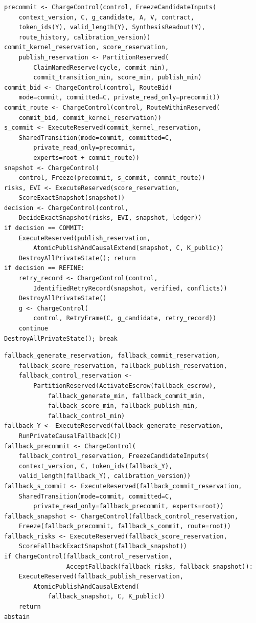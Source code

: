 \documentclass[10pt,a4paper]{article}
\begin{document}
\begin{lstlisting}[caption={Barrier-mediated verification, synthesis, and atomic commitment.},label={lst:verify}]
precommit <- ChargeControl(control, FreezeCandidateInputs(
    context_version, C, g_candidate, A, V, contract,
    token_ids(Y), valid_length(Y), SynthesisReadout(Y),
    route_history, calibration_version))
commit_kernel_reservation, score_reservation,
    publish_reservation <- PartitionReserved(
        ClaimNamedReserve(cycle, commit_min),
        commit_transition_min, score_min, publish_min)
commit_bid <- ChargeControl(control, RouteBid(
    mode=commit, committed=C, private_read_only=precommit))
commit_route <- ChargeControl(control, RouteWithinReserved(
    commit_bid, commit_kernel_reservation))
s_commit <- ExecuteReserved(commit_kernel_reservation,
    SharedTransition(mode=commit, committed=C,
        private_read_only=precommit,
        experts=root + commit_route))
snapshot <- ChargeControl(
    control, Freeze(precommit, s_commit, commit_route))
risks, EVI <- ExecuteReserved(score_reservation,
    ScoreExactSnapshot(snapshot))
decision <- ChargeControl(control,
    DecideExactSnapshot(risks, EVI, snapshot, ledger))
if decision == COMMIT:
    ExecuteReserved(publish_reservation,
        AtomicPublishAndCausalExtend(snapshot, C, K_public))
    DestroyAllPrivateState(); return
if decision == REFINE:
    retry_record <- ChargeControl(control,
        IdentifiedRetryRecord(snapshot, verified, conflicts))
    DestroyAllPrivateState()
    g <- ChargeControl(
        control, RetryFrame(C, g_candidate, retry_record))
    continue
DestroyAllPrivateState(); break
\end{lstlisting}

\begin{lstlisting}[caption={Single-escrow causal fallback and guarded publication.},label={lst:fallback}]
fallback_generate_reservation, fallback_commit_reservation,
    fallback_score_reservation, fallback_publish_reservation,
    fallback_control_reservation <-
        PartitionReserved(ActivateEscrow(fallback_escrow),
            fallback_generate_min, fallback_commit_min,
            fallback_score_min, fallback_publish_min,
            fallback_control_min)
fallback_Y <- ExecuteReserved(fallback_generate_reservation,
    RunPrivateCausalFallback(C))
fallback_precommit <- ChargeControl(
    fallback_control_reservation, FreezeCandidateInputs(
    context_version, C, token_ids(fallback_Y),
    valid_length(fallback_Y), calibration_version))
fallback_s_commit <- ExecuteReserved(fallback_commit_reservation,
    SharedTransition(mode=commit, committed=C,
        private_read_only=fallback_precommit, experts=root))
fallback_snapshot <- ChargeControl(fallback_control_reservation,
    Freeze(fallback_precommit, fallback_s_commit, route=root))
fallback_risks <- ExecuteReserved(fallback_score_reservation,
    ScoreFallbackExactSnapshot(fallback_snapshot))
if ChargeControl(fallback_control_reservation,
                 AcceptFallback(fallback_risks, fallback_snapshot)):
    ExecuteReserved(fallback_publish_reservation,
        AtomicPublishAndCausalExtend(
            fallback_snapshot, C, K_public))
    return
abstain
\end{lstlisting}
\end{document}
